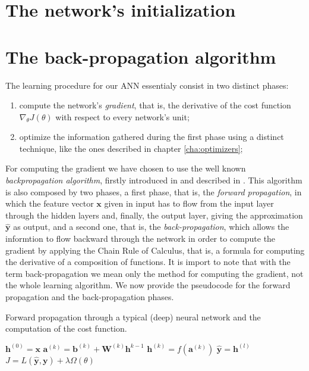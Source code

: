 	\section{The network's initialization} %
	\label{sec:the_network_s_initialization}


	\section{The back-propagation algorithm} %
	\label{sec:the_back-propagation_algorithm}
		The learning procedure for our ANN essentialy consist in two distinct phases:

		\begin{enumerate}
			\item compute the network's \textit{gradient}, that is, the derivative of the cost function
			$\nabla_{\theta} J(\theta)$ with respect to every network's unit;
			\item optimize the information gathered during the first phase using a distinct technique, like the
			ones described in chapter \ref{cha:optimizers};
		\end{enumerate}

		For computing the gradient we have chosen to use
		the well known \textit{backpropagation algorithm}, firstly introduced in \cite{10028086174} and described
		in \cite{Goodfellow-et-al-2016,haykin2009neural,mitchell1997machine}. This algorithm is
		also composed by two phases, a first phase, that is, the \textit{forward propagation}, in which the
		feature vector $\mathbf{x}$ given in input has to flow from the input layer through the hidden layers and,
		finally, the output layer, giving the approximation $\hat{\mathbf{y}}$ as output, and a second one, that
		is, the \textit{back-propagation}, which allows the informtion to flow backward through the network in
		order to compute the gradient by applying the Chain Rule of Calculus, that is, a formula for computing the
		derivative of a composition of functions. It is import to note that with the term back-propagation we mean
		only the method for computing the gradient, not the whole learning algorithm. We now provide the
		pseudocode for the forward propagation and the back-propagation phases.

		\begin{algorithm}
			\caption{Forward propagation through a typical (deep) neural network and the computation of the cost
			function.}
			\label{alg:forward_propagation}
			\begin{algorithmic}[1]
					\State $\mathbf{h}^{(0)} = \mathbf{x}$
						\State $\mathbf{a}^{(k)} = \mathbf{b}^{(k)} + \mathbf{W}^{(k)}\mathbf{h}^{k - 1}$
						\State $\mathbf{h}^{(k)} = f(\mathbf{a}^{(k)})$
					\EndFor
					\State $\hat{\mathbf{y}} = \mathbf{h}^{(l)}$
					\State $J = L(\hat{\mathbf{y}}, \mathbf{y}) + \lambda \Omega(\theta)$
				\EndProcedure
			\end{algorithmic}
		\end{algorithm}

